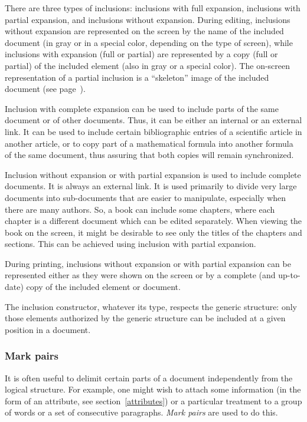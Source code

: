 There are three types of inclusions: inclusions with full expansion,
inclusions with partial expansion, and inclusions without expansion.
During editing, inclusions without expansion are represented on the
screen by the name of the included document (in gray or in a special
color, depending on the type of screen), while inclusions with
expansion (full or partial) are represented by a copy (full or
partial) of the included element (also in gray or a special color).
The on-screen representation of a partial inclusion is a ``skeleton''
image of the included document (see page~\pageref{squelette}).

Inclusion with complete expansion can be used to include parts of the
same document or of other documents.  Thus, it can be either an
internal or an external link.  It can be used to include certain
bibliographic entries of a scientific article in another article, or
to copy part of a mathematical formula into another formula of the
same document, thus assuring that both copies will remain
synchronized.

Inclusion without expansion or with partial expansion is used to
include complete documents.  It is always an external link.  It is
used primarily to divide very large documents into sub-documents that
are easier to manipulate, especially when there are many authors.  So,
a book can include some chapters, where each chapter is a different
document which can be edited separately.  When viewing the book on the
screen, it might be desirable to see only the titles of the chapters
and sections.  This can be achieved using inclusion with partial
expansion.

During printing, inclusions without expansion or with partial
expansion can be represented either as they were shown on the screen
or by a complete (and up-to-date) copy of the included element or document.

The inclusion constructor, whatever its type, respects the generic
structure: only those elements authorized by the generic structure can
be included at a given position in a document.

\subsubsection{Mark pairs}

It is often useful to delimit certain parts of a document
independently from the logical structure.  For example, one might wish
to attach some information (in the form of an attribute, see
section~\ref{attributes}) or a particular treatment to a group of words
or a set of consecutive paragraphs.  {\em Mark pairs} are used to do
this.

